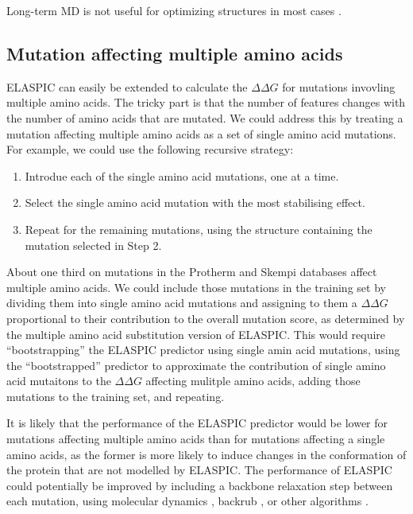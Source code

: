 Long-term MD is not useful for optimizing structures in most cases \cite{raval_refinement_2012}.



\subsection{Mutation affecting multiple amino acids}

ELASPIC can easily be extended to calculate the $\Delta \Delta G$ for mutations invovling multiple amino acids. The tricky part is that the number of features changes with the number of amino acids that are mutated. We could address this by treating a mutation affecting multiple amino acids as a set of single amino acid mutations. For example, we could use the following recursive strategy:

\begin{enumerate}
    \item Introdue each of the single amino acid mutations, one at a time.
    \item Select the single amino acid mutation with the most stabilising effect.
    \item Repeat for the remaining mutations, using the structure containing the mutation selected in Step 2.
\end{enumerate}

About one third on mutations in the Protherm and Skempi databases affect multiple amino acids. We could include those mutations in the training set by dividing them into single amino acid mutations and assigning to them a $\Delta \Delta G$ proportional to their contribution to the overall mutation score, as determined by the multiple amino acid substitution version of ELASPIC. This would require ``bootstrapping'' the ELASPIC predictor using single amin acid mutations, using the ``bootstrapped'' predictor to approximate the contribution of single amino acid mutaitons to the $\Delta \Delta G$ affecting mulitple amino acids, adding those mutations to the training set, and repeating.

It is likely that the performance of the ELASPIC predictor would be lower for mutations affecting multiple amino acids than for mutations affecting a single amino acids, as the former is more likely to induce changes in the conformation of the protein that are not modelled by ELASPIC. The performance of ELASPIC could potentially be improved by including a backbone relaxation step between each mutation, using molecular dynamics \cite{abraham_gromacs:_2015}, backrub \cite{smith_predicting_2011}, or other algorithms \cite{sun_protein_2016}.

